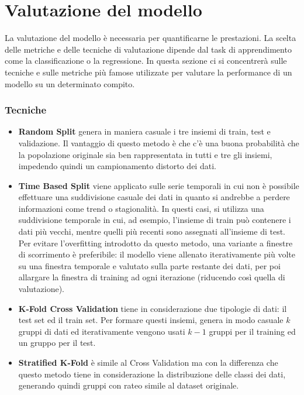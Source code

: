 \section{Valutazione del modello}
La valutazione del modello è necessaria per quantificarne le prestazioni. La
scelta delle metriche e delle tecniche di valutazione dipende dal task di apprendimento come la classificazione o la regressione. 
In questa sezione ci si concentrerà sulle tecniche e sulle metriche più famose utilizzate per valutare la performance di un modello su un determinato compito.

\subsubsection{Tecniche}
\begin{itemize}
	\item \textbf{Random Split} genera in maniera casuale i tre insiemi di train, test e validazione. Il vantaggio di questo metodo è che c'è una buona probabilità che la popolazione originale sia ben rappresentata in tutti e tre gli insiemi, impedendo quindi un campionamento distorto dei dati.
	\item \textbf{Time Based Split} viene applicato sulle serie temporali in cui non è possibile effettuare una suddivisione casuale dei dati in quanto si andrebbe a perdere informazioni come trend o stagionalità. 
	      In questi casi, si utilizza una suddivisione temporale in cui, ad esempio, l'insieme di train può contenere i dati più vecchi, mentre quelli più recenti sono assegnati all'insieme di test. Per evitare l'overfitting introdotto da questo metodo, una variante a finestre di scorrimento è preferibile: il modello viene allenato iterativamente più volte su una finestra temporale e valutato sulla parte restante dei dati, per poi allargare la finestra di training ad ogni iterazione (riducendo così quella di valutazione).
	\item \textbf{K-Fold Cross Validation} tiene in considerazione due tipologie di dati: il test set ed il train set. Per formare questi insiemi, genera in modo casuale $k$ gruppi di dati ed iterativamente vengono usati $k-1$ gruppi per il training ed un gruppo per il test.
	\item \textbf{Stratified K-Fold} è simile al Cross Validation ma con la differenza che questo metodo tiene in considerazione la distribuzione delle classi dei dati, generando quindi gruppi con rateo simile al dataset originale.
\end{itemize}


